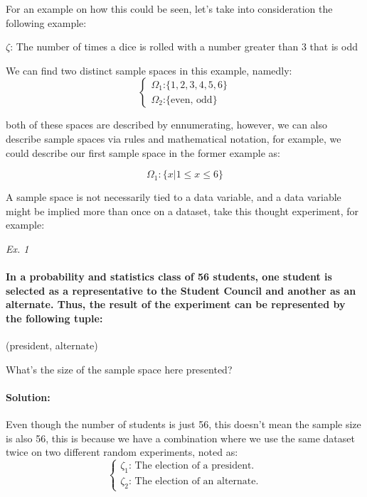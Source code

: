 \documentclass[11pt,fleqn]{book} %
\begin{document}
For an example on how this could be seen, let's take into consideration the following example:

$ \zeta $: The number of times a dice is rolled with a number greater than 3 that is odd

We can find two distinct sample spaces in this example, namedly:
$$
\begin{cases}
    \Omega_1 \text{:} \{ 1,2,3,4,5,6 \} \\
    \Omega_2 \text{:} \{ \text{even, odd} \}    
\end{cases}
$$

both of these spaces are described by ennumerating, however, we can also describe sample spaces via rules and mathematical notation,
for example, we could describe our first sample space in the former example as:

$$ \Omega_1: \{ x | 1 \le x \le 6 \} $$

A sample space is not necessarily tied to a data variable, and a data variable might be implied more than once on a dataset,
take this thought experiment, for example:

\textit{Ex. 1}

\paragraph*{In a probability and statistics class of 56 students, one student is selected as a representative to the Student Council and another as an alternate. Thus, the result of the experiment can be represented by the following tuple:}
\begin{center}
    (president, alternate)    
\end{center}

What's the size of the sample space here presented?

\paragraph{Solution:}

Even though the number of students is just 56, this doesn't mean the sample size is also
56, this is because we have a combination where we use the same dataset twice on two 
different random experiments, noted as:
$$
\begin{cases}
    \zeta_1 \text{: The election of a president.}\\
    \zeta_2 \text{: The election of an alternate.}
\end{cases}
$$
\end{document}
